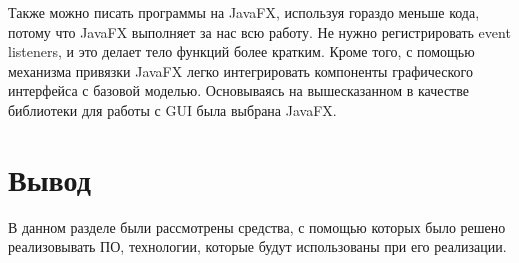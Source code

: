Также можно писать программы на JavaFX, используя гораздо меньше кода, потому что JavaFX выполняет за нас всю работу. Не нужно регистрировать event listeners, и это делает тело функций более кратким. Кроме того, с помощью механизма привязки JavaFX легко интегрировать компоненты графического интерфейса с базовой моделью. Основываясь на вышесказанном в качестве библиотеки для работы с GUI была выбрана JavaFX.


\section*{Вывод}

В данном разделе были рассмотрены средства, с помощью которых было решено реализовывать ПО, технологии, которые будут использованы при его реализации.
